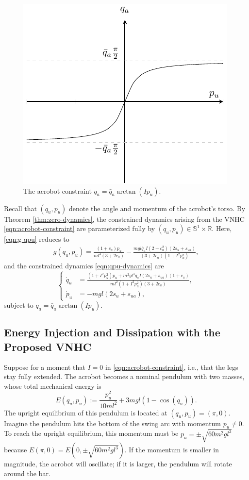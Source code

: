 \documentclass[journal,twoside,web, twocolumn,draftcls]{ieeecolor}
\newcommand*{\R}{\mathbb{R}}
\newcommand*{\Sone}{\mathbb{S}^1}
\newcommand*{\SxR}{\Sone \times \R}
\begin{document}
\begin{figure}
    \centering
    \includegraphics[width=0.7\linewidth]{qa_arctan.pdf}
    \caption{The acrobot constraint \(q_a = \bar{q}_a \arctan(I p_u)\).}
    \label{fig:qa-arctan}
\end{figure}

Recall that \((q_u, p_u)\) denote the angle and momentum of the acrobot's torso.
By Theorem \ref{thm:zero-dynamics}, the constrained dynamics arising from the
VNHC \eqref{eqn:acrobot-constraint} are parameterized fully by 
\((q_u,p_u) \in \SxR\).
Here, \eqref{eqn:g-qpu} reduces to
\begin{multline*}
    g(q_u,p_u) = \frac{
    (1+c_a)p_u}{ml^2(3+2c_a)}
    - \frac{mgl\bar{q}_a I (2-c_a^2)(2s_u + s_{ua})
    }{(3+2c_a)(1+I^2 p_u^2)}
    ,
\end{multline*}
and the constrained dynamics \eqref{eqn:qpu-dynamics} are
\begin{equation}\label{eqn:acrobot-constrained-dynamics}
    \begin{cases}
    \dot{q}_u &= \frac{(1+I^2 p_u^2)p_u + m^2gl^3\bar{q}_a I(2s_u + s_{ua})(1+c_a) }
            {ml^2(1+I^2 p_u^2)(3+2c_a)}
    ,    \\
    \dot{p}_u &= - m g l (2s_u + s_{ua})
    ,
    \end{cases}
\end{equation}
subject to \(q_a = \bar{q}_a \arctan(I p_u)\).

\subsection{Energy Injection and Dissipation with the Proposed VNHC}
Suppose for a moment that \(I = 0\) in \eqref{eqn:acrobot-constraint}, i.e.,
that the legs stay fully extended.
The acrobot becomes a nominal pendulum with two masses, whose total mechanical
energy is
\begin{equation}\label{eqn:nominal-energy}
    E(q_u,p_u) := \frac{p_u^2}{10ml^2} + 3mgl(1 - \cos(q_u))
    .
\end{equation}
The upright equilibrium of this pendulum is located at \((q_u,p_u) = (\pi,0)\).
Imagine the pendulum hits the bottom of the swing arc with momentum 
\(p_u \neq 0\). 
To reach the upright equilibrium, this momentum must be
\(p_u = \pm\sqrt{60m^2gl^3}\) because \(E(\pi,0) = E(0,\pm\sqrt{60m^2gl^3})\).
If the momentum is smaller in magnitude, the acrobot will oscillate; 
if it is larger, the pendulum will rotate around the bar.
\end{document}
